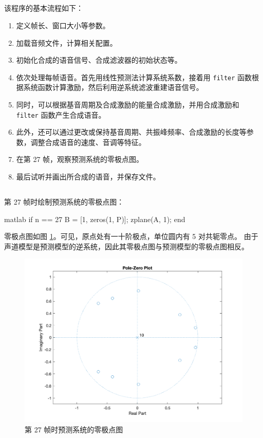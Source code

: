 \documentclass[a4paper]{article}  %
\begin{document}
\subsection{}

该程序的基本流程如下：
\begin{enumerate}[i]
    \item 定义帧长、窗口大小等参数。
    \item 加载音频文件，计算相关配置。
    \item 初始化合成的语音信号、合成滤波器的初始状态等。
    \item 依次处理每帧语音。首先用线性预测法计算系统系数，接着用 \texttt{filter} 函数根据系统函数计算激励，然后利用逆系统滤波重建语音信号。
    \item 同时，可以根据基音周期及合成激励的能量合成激励，并用合成激励和 \texttt{filter} 函数产生合成语音。
    \item 此外，还可以通过更改或保持基音周期、共振峰频率、合成激励的长度等参数，调整合成语音的速度、音调等特征。
    \item 在第 27 帧，观察预测系统的零极点图。
    \item 最后试听并画出所合成的语音，并保存文件。
\end{enumerate}

\subsection{}

第 27 帧时绘制预测系统的零极点图：
\begin{codeblock}{matlab}
if n == 27
    B = [1, zeros(1, P)];
    zplane(A, 1); 
end
\end{codeblock}

零极点图如图 \ref{fig:1_3_zplane}。可见，原点处有一十阶极点，单位圆内有 5 对共轭零点。
由于声道模型是预测模型的逆系统，因此其零极点图与预测模型的零极点图相反。

\begin{figure}[ht]
    \centering
    \includegraphics[width=.6\textwidth]{asserts/1_3_zplane.png}
    \caption{
        第 27 帧时预测系统的零极点图
    }\label{fig:1_3_zplane}
\end{figure}
\end{document}
